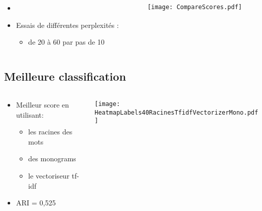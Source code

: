 \documentclass[8pt,aspectratio=169,hyperref={unicode=true}]{beamer}
\begin{document}
\begin{frame}{\insertsubsection}
\begin{columns}
\begin{column}{.45\textwidth}
\begin{itemize}
\begin{itemize}
                      \end{itemize}
                \item[]
                \item Essais de différentes perplexités :
                      \begin{itemize}
                          \item de 20 à 60 par pas de 10
                      \end{itemize}
            \end{itemize}
        \end{column}
        \begin{column}{.55\textwidth}
            \texttt{[image: CompareScores.pdf]}
        \end{column}
    \end{columns}
\end{frame}

\subsection{Meilleure classification}
\begin{frame}{\insertsubsection}
    \begin{columns}
        \begin{column}{.4\textwidth}
            \begin{itemize}
                \item Meilleur score en utilisant:
                      \begin{itemize}
                          \item les racines des mots
                          \item des monograms
                          \item le vectoriseur tf-idf
                      \end{itemize}
                \item ARI = 0,525
            \end{itemize}
        \end{column}
        \begin{column}{.6\textwidth}
            \texttt{[image: HeatmapLabels40RacinesTfidfVectorizerMono.pdf]}
        \end{column}
    \end{columns}
\end{frame}
\end{document}
